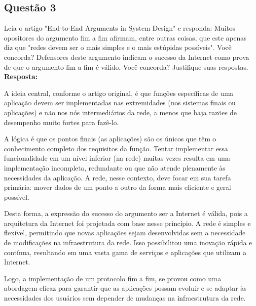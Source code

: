 \subsection{Questão 3}
Leia o artigo "End-to-End Arguments in System Design" e responda:
Muitos opositores do argumento fim a fim afirmam, entre outras coisas, que este
apenas diz que "redes devem ser o mais simples e o mais estúpidas possíveis".
Você concorda? Defensores deste argumento indicam o sucesso da Internet como
prova de que o argumento fim a fim é válido. Você concorda? Justifique suas
respostas.\\

\noindent
\textbf{Resposta:}

A ideia central, conforme o artigo original, é que funções específicas de uma aplicação devem ser implementadas nas extremidades (nos sistemas finais ou aplicações) e não nos nós intermediários da rede, a menos que haja razões de desempenho muito fortes para fazê-lo.

A lógica é que os pontos finais (as aplicações) são os únicos que têm o conhecimento completo dos requisitos da função. Tentar implementar essa funcionalidade em um nível inferior (na rede) muitas vezes resulta em uma implementação incompleta, redundante ou que não atende plenamente às necessidades da aplicação. A rede, nesse contexto, deve focar em sua tarefa primária: mover dados de um ponto a outro da forma mais eficiente e geral possível.

Desta forma, a expressão do sucesso do argumento ser a Internet é válida, pois a arquitetura da Internet foi projetada com base nesse princípio. A rede é simples e flexível, permitindo que novas aplicações sejam desenvolvidas sem a necessidade de modificações na infraestrutura da rede. Isso possibilitou uma inovação rápida e contínua, resultando em uma vasta gama de serviços e aplicações que utilizam a Internet.

Logo, a implementação de um protocolo fim a fim, se provou como uma abordagem eficaz para garantir que as aplicações possam evoluir e se adaptar às necessidades dos usuários sem depender de mudanças na infraestrutura da rede. 